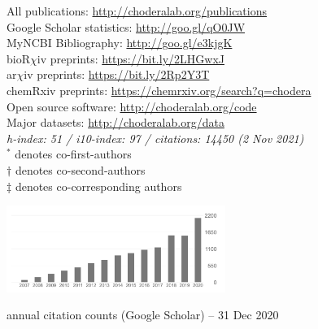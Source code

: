 \documentclass[10pt]{article}
\begin{document}
\begin{minipage}[t]{3.2in}
All publications: \href{http://choderalab.org/publications}{http://choderalab.org/publications} \\
Google Scholar statistics: \href{http://goo.gl/qO0JW}{http://goo.gl/qO0JW} \hspace{0.2in} \\
MyNCBI Bibliography: \href{http://goo.gl/e3kjgK}{http://goo.gl/e3kjgK} \\
bioR$\chi$iv preprints: \href{https://bit.ly/2LHGwxJ}{https://bit.ly/2LHGwxJ} \\
ar$\chi$iv preprints: \href{https://bit.ly/2Rp2Y3T}{https://bit.ly/2Rp2Y3T} \\
chemRxiv preprints: \href{https://chemrxiv.org/search?q=chodera}{https://chemrxiv.org/search?q=chodera} \\
Open source software: \href{http://choderalab.org/code}{http://choderalab.org/code}\\
Major datasets: \href{http://choderalab.org/data}{http://choderalab.org/data} \\
{\small \it h-index: 51 / i10-index: 97 / citations: 14450 (2 Nov 2021)} \\
{\scriptsize $^*$ denotes co-first-authors \\
$\dag$ denotes co-second-authors \\
$\ddag$ denotes co-corresponding authors}
\end{minipage}
\quad
\begin{minipage}[t]{3in}

\includegraphics[width=2.8in,valign=t]{thumbnails/citations-2020-12-31.png}

\vspace{0.05in}
{\small annual citation counts (Google Scholar) -- 31 Dec 2020}
\end{minipage}



\end{document}
